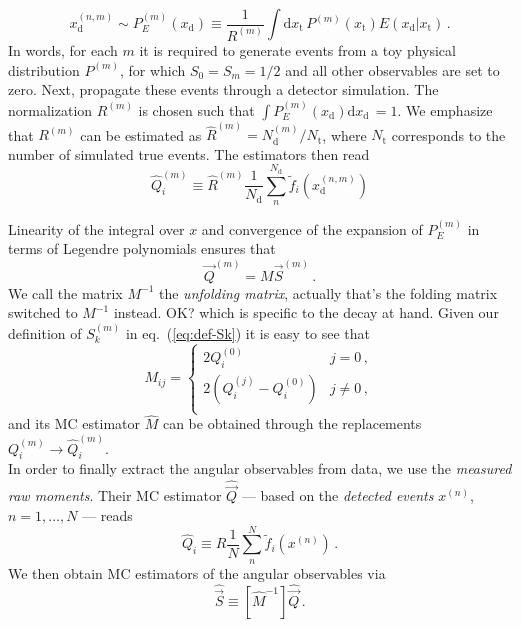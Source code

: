 \documentclass[aps,nofootinbib,preprintnumbers,prd,twocolumn]{revtex4-1}
\newcommand{\est}[1]{\widehat{#1}}
\newcommand{\refeq}[1]{eq.~(\ref{eq:#1})}
\newcommand{\rmdx}[1]{\mbox{d} #1 \,} %
\newcommand{\subd}{_{\text{d}}}
\newcommand{\subt}{_{\text{t}}}
\newcommand{\vecest}[1]{\widehat{\vec{#1}}}
\newcommand{\xd}{x\subd}
\newcommand{\xt}{x\subt}
\newcommand{\Ekernel}{E(\xd|\xt)}
\newcommand{\danny}[1]{{\color{purple}#1}}
\newcommand{\fred}[1]{{\color{brown!85!black}#1}}
\newcommand{\add}[1]{\textcolor{green!85!black}{#1}}
\begin{document}
\begin{equation}
    x_\text{d}^{(n,m)} \sim P_E^{(m)}(\xd) \equiv \frac{1}{R^{(m)}} \int \rmdx{\xt} P^{(m)}(\xt) \Ekernel\,.
\end{equation}
In words, for each $m$ it is required to generate events from
a toy physical distribution $P^{(m)}$, for which $S_0 = S_m=1/2$ and all other
observables are set to zero. Next, propagate these events through
a detector simulation. The normalization $R^{(m)}$ is chosen such
that $\int P_E^{(m)}(\xd) \rmdx{\xd} = 1$.  We emphasize that
$R^{(m)}$ can be estimated as $\est{R}^{(m)} = N_\text{d}^{(m)} /
N_\text{t}$, where $N_\text{t}$ corresponds to the number of
simulated true events.  The estimators then read
\begin{equation}
    \est{Q}_i^{(m)} \equiv \est{R}^{(m)} \frac{1}{N_\text{d}} \sum_n^{N_\text{d}} \tilde{f}_i(x_\text{d}^{(n,m)})
\end{equation}

Linearity of the integral over $x$ and convergence of the expansion of
$P_E^{(m)}$ in terms of Legendre polynomials ensures that
\begin{equation}
    \vec{Q}^{(m)} = M \vec{S}^{(m)}\,.
\end{equation}
We call the matrix \add{$M^{-1}$} the \emph{unfolding matrix},
\fred{actually that's the folding matrix}
\danny{switched to $M^{-1}$ instead. OK?}
which is specific to the decay at hand.
Given our definition of $S_k^{(m)}$ in
\refeq{def-Sk} it is easy to see that
\begin{equation}
    M_{ij} = \begin{cases}
        2 Q_i^{(0)}                          & j = 0\,,\\
        2\left(Q_i^{(j)} - Q_i^{(0)}\right)  & j \neq 0\,,\\
    \end{cases}
\end{equation}
and its MC estimator $\est{M}$  can be obtained through the replacements $Q_i^{(m)} \to \est{Q}_i^{(m)}$.\\

In order to finally extract the angular observables from data, we use the \emph{measured raw moments}. Their MC estimator
$\vecest{Q}$ --- based on the \emph{detected events} $x^{(n)}$, $n=1,\dots,N$ --- reads
\begin{equation}
    \est{Q}_i \equiv R \frac{1}{N} \sum_n^N \tilde{f}_i(x^{(n)})\,.
\end{equation}
We then obtain MC estimators of the angular observables via
\begin{equation}
    \label{eq:estS}
    \vecest{S} \equiv \left[\est{M}^{-1}\right] \vecest{Q}\,.
\end{equation}
\end{document}
